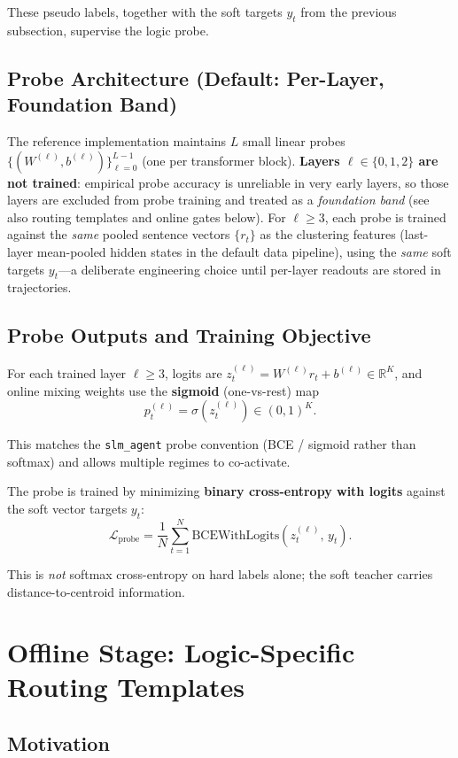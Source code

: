 \documentclass[11pt]{article}
\begin{document}
These pseudo labels, together with the soft targets $y_t$ from the previous subsection, supervise the logic probe.

\subsection{Probe Architecture (Default: Per-Layer, Foundation Band)}

The reference implementation maintains $L$ small linear probes $\{(W^{(\ell)},b^{(\ell)})\}_{\ell=0}^{L-1}$ (one per transformer block). \textbf{Layers $\ell\in\{0,1,2\}$ are not trained}: empirical probe accuracy is unreliable in very early layers, so those layers are excluded from probe training and treated as a \emph{foundation band} (see also routing templates and online gates below). For $\ell\ge 3$, each probe is trained against the \emph{same} pooled sentence vectors $\{r_t\}$ as the clustering features (last-layer mean-pooled hidden states in the default data pipeline), using the \emph{same} soft targets $y_t$---a deliberate engineering choice until per-layer readouts are stored in trajectories.

\subsection{Probe Outputs and Training Objective}

For each trained layer $\ell\ge 3$, logits are $z^{(\ell)}_t = W^{(\ell)} r_t + b^{(\ell)}\in\mathbb{R}^K$, and online mixing weights use the \textbf{sigmoid} (one-vs-rest) map
\[
p_t^{(\ell)} = \sigma(z^{(\ell)}_t)\in(0,1)^K.
\]

This matches the \texttt{slm\_agent} probe convention (BCE / sigmoid rather than softmax) and allows multiple regimes to co-activate.

The probe is trained by minimizing \textbf{binary cross-entropy with logits} against the soft vector targets $y_t$:
\[
\mathcal{L}_{\text{probe}}
=
\frac{1}{N}\sum_{t=1}^{N}\mathrm{BCEWithLogits}\!\left(z^{(\ell)}_t,\, y_t\right).
\]

This is \emph{not} softmax cross-entropy on hard labels alone; the soft teacher carries distance-to-centroid information.

\section{Offline Stage: Logic-Specific Routing Templates}

\subsection{Motivation}
\end{document}
